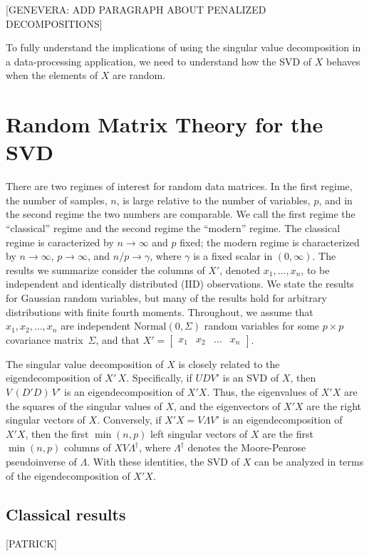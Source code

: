\documentclass{eoeauth}
\newcommand{\Normal}{\mathrm{Normal }}
\begin{document}
[GENEVERA: ADD PARAGRAPH ABOUT PENALIZED DECOMPOSITIONS]

To fully understand the implications of using the singular value
decomposition in a data-processing application, we need to understand
how the SVD of $X$ behaves when the elements of $X$ are random.


\section{Random Matrix Theory for the SVD}

There are two regimes of interest for random data matrices.  In the
first regime, the number of samples, $n$, is large relative to the number of
variables, $p$, and in the second regime the two numbers are comparable.
We call the first regime the ``classical'' regime and the second
regime the ``modern'' regime.  The classical regime is caracterized by
$n \to \infty$ and $p$ fixed; the modern regime is characterized by $n
\to \infty$, $p \to \infty$, and $n/p \to \gamma$, where $\gamma$ is a
fixed scalar in $(0,\infty)$.  The results we summarize consider the
columns of $X'$, denoted $x_1, \dotsc, x_n$, to be independent and
identically distributed (IID) observations.  We state the results for
Gaussian random variables, but many of the results hold for
arbitrary distributions with finite fourth moments.  Throughout, we
assume that $x_1, x_2, \dotsc, x_n$ are independent $\Normal(0, \Sigma)$ random
variables for some $p \times p$ covariance matrix~$\Sigma$, and that
\(
  X' =
  \begin{bmatrix}
    x_1 & x_2 & \dots & x_n
  \end{bmatrix}.
\)

The singular value decomposition of $X$ is closely related to the
eigendecomposition of $X' \, X$.  Specifically, if $U D V'$ is an SVD
of $X$, then $V \, (D' D) \, V'$ is an eigendecomposition of $X' X$.
Thus, the eigenvalues of $X' X$ are the squares of the singular values
of $X$, and the eigenvectors of $X' X$ are the right singular vectors
of $X$.  Conversely, if $X' X = V \Lambda V'$ is an eigendecomposition of
$X' X$, then the first $\min(n,p)$ left singular vectors of $X$ are the
first $\min(n,p)$ columns of $X V \Lambda^\dagger$, where
$\Lambda^\dagger$ denotes the Moore-Penrose pseudoinverse of $\Lambda$.
With these identities, the SVD of $X$ can be analyzed in terms of the
eigendecomposition of $X' X$.


\subsection{Classical results}
[PATRICK]
\end{document}
